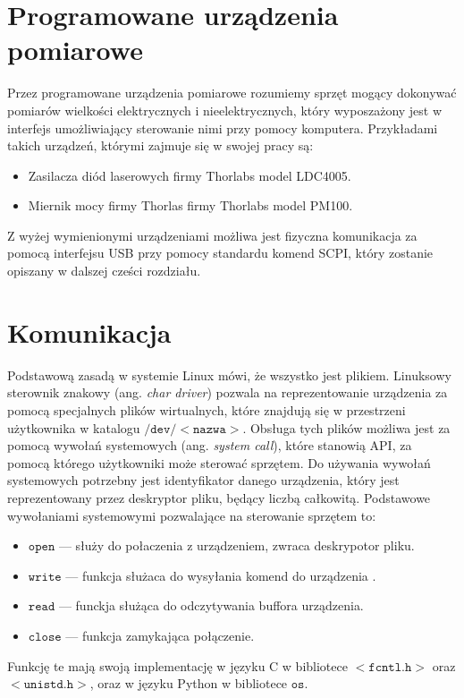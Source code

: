 \section{Programowane urządzenia pomiarowe}
Przez programowane urządzenia pomiarowe rozumiemy sprzęt mogący dokonywać pomiarów wielkości elektrycznych i nieelektrycznych,
który wyposzażony jest w interfejs umożliwiający sterowanie nimi przy pomocy komputera. Przykładami takich urządzeń, którymi zajmuje się w swojej pracy są:
\begin{itemize}
\item Zasilacza diód laserowych firmy Thorlabs model LDC4005.
\item Miernik mocy firmy Thorlas firmy Thorlabs model PM100.
\end{itemize}
Z wyżej wymienionymi urządzeniami możliwa jest fizyczna komunikacja za pomocą interfejsu USB przy pomocy standardu komend SCPI,
który zostanie opiszany w dalszej cześci rozdziału.

\section{Komunikacja}
Podstawową zasadą w systemie Linux mówi, że wszystko jest plikiem. Linuksowy sterownik znakowy (ang. \textit{char driver})
pozwala na reprezentowanie urządzenia za pomocą specjalnych plików wirtualnych, które znajdują się w przestrzeni
użytkownika w katalogu $\mathtt{/dev/<nazwa>}$. Obsługa tych plików możliwa jest za pomocą wywołań systemowych (ang. \textit{system call}),
które stanowią API, za pomocą którego użytkowniki może sterować sprzętem. Do używania wywołań systemowych potrzebny jest
identyfikator danego urządzenia, który jest reprezentowany przez deskryptor pliku, będący liczbą całkowitą.
Podstawowe wywołaniami systemowymi pozwalające na sterowanie sprzętem to:
\begin{itemize}
\item $\mathtt{open}$ --- służy do połaczenia z urządzeniem, zwraca deskrypotor pliku.
\item $\mathtt{write}$ --- funkcja służaca do wysyłania komend do urządzenia .
\item $\mathtt{read}$ --- funckja służąca do odczytywania buffora urządzenia.
\item $\mathtt{close}$ --- funkcja zamykająca połączenie.
\end{itemize}
Funkcję te mają swoją implementację w języku C w bibliotece $<\mathtt{fcntl.h}>$ oraz $<\mathtt{unistd.h}>$, oraz w języku Python w bibliotece $\mathtt{os}$.
